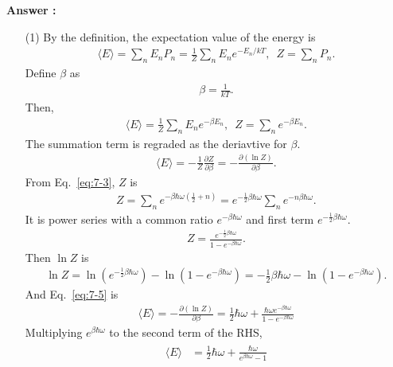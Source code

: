\documentclass[floatfix,nofootinbib,superscriptaddress,fleqn]{revtex4-2}
\begin{document}
\noindent \textbf{Answer : }
\begin{itemize}
  \item[(1)] By the definition, the expectation value of the energy is
  \begin{align}
    \langle E\rangle = \sum_n E_nP_n 
    = \frac{1}{Z}\sum_n E_n e^{-E_n/kT},   \,\,\,
    Z = \sum_n P_n.
  \end{align}
  Define $\beta$ as
  \begin{align}\label{eq:7-4}
    \beta =\frac{1}{kT}.
  \end{align}
  Then,
  \begin{align}
    \langle E\rangle = \frac{1}{Z}\sum_n E_n e^{-\beta E_n},   \,\,\,
    Z = \sum_n e^{-\beta E_n}.
  \end{align}
  The summation term is regraded as the deriavtive for $\beta$.
  \begin{align}\label{eq:7-5}
    \langle E\rangle = -\frac{1}{Z}\frac{\partial Z}{\partial \beta}
    = -\frac{\partial (\ln{Z})}{\partial \beta}.
  \end{align}
  From Eq.~\eqref{eq:7-3}, $Z$ is
  \begin{align}
    Z = \sum_n e^{-\beta\hbar\omega(\frac{1}{2}+n)} 
    = e^{-\frac{1}{2}\beta\hbar\omega}\sum_n 
    e^{-n\beta\hbar\omega}.
  \end{align}
  It is power series with a common ratio 
  $e^{-\beta\hbar\omega}$ 
  and first term $e^{-\frac{1}{2}\beta\hbar\omega}$.
  \begin{align}
    Z = \frac{e^{-\frac{1}{2}\beta\hbar\omega}}
    {1-e^{-\beta\hbar\omega}}.
  \end{align}
  Then $\ln{Z}$ is
  \begin{align}
    \ln{Z} = \ln{\left(e^{-\frac{1}{2}\beta\hbar\omega}
    \right)}
    -\ln{\left(1-e^{-\beta\hbar\omega}\right)}
    =-\frac{1}{2}\beta\hbar\omega
    -\ln{\left(1-e^{-\beta\hbar\omega}\right)}.
  \end{align}
  And Eq.~\eqref{eq:7-5} is
  \begin{align}
      \langle E\rangle = -\frac{\partial (\ln{Z})}
      {\partial \beta}
      = \frac{1}{2}\hbar\omega
      +\frac{\hbar\omega e^{-\beta\hbar\omega}}
      {1-e^{-\beta\hbar\omega}}  
  \end{align}
  Multiplying $e^{\beta\hbar\omega}$ to the second term of the RHS,
  \begin{align}
    \begin{split}\label{eq:7-6}
      \langle E\rangle &=\frac{1}{2}\hbar\omega
      +\frac{\hbar\omega}{e^{\beta\hbar\omega}-1} \\

\end{split}
\end{align}
\end{itemize}
\end{document}
